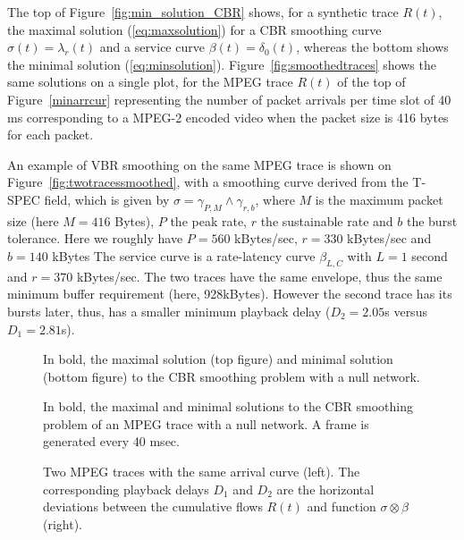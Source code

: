 The top of Figure~\ref{fig:min_solution_CBR} shows, for a synthetic trace $R(t)$,
 the maximal solution (\ref{eq:maxsolution}) for a CBR smoothing curve
$\sigma(t) = \lambda_r(t)$ and a service curve $\beta(t) = \delta_0(t)$,
whereas the bottom shows %
the minimal solution (\ref{eq:minsolution}). Figure~\ref{fig:smoothedtraces} shows the same solutions on a single
plot, for the MPEG trace $R(t)$ of the top of Figure~\ref{minarrcur} representing the number of packet arrivals per time slot of 40 ms corresponding to a MPEG-2 encoded video when the packet size is 416 bytes for each packet.

An example of VBR smoothing on the same MPEG trace is shown on Figure~\ref{fig:twotracessmoothed}, with a smoothing curve derived from the T-SPEC field, which is
given by $\sigma = \gamma_{P,M} \wedge \gamma_{r,b}$, where $M$ is the maximum packet size (here $M= 416$ Bytes),
$P$ the peak rate, $r$ the sustainable rate and $b$ the burst tolerance. Here we roughly have
$P = 560$ kBytes/sec, $r = 330$ kBytes/sec and $b = 140$ kBytes
The service curve is a rate-latency curve $\beta_{L,C}$ with $L = 1$ second and $r = 370$ kBytes/sec.
The two traces have the same envelope, thus the same minimum buffer requirement (here, 928kBytes).
However the second trace has its bursts later, thus, has a smaller
   minimum playback delay ($D_2=2.05$s versus $D_1=2.81$s).


\begin{figure}[h!]
\caption{In bold, the maximal solution (top figure) and minimal solution (bottom figure)
to the CBR  smoothing problem with a null network.}
\end{figure}

\begin{figure}[h!]
\caption{In bold, the maximal and minimal solutions
to the CBR  smoothing problem of an MPEG trace with a null network. A frame is generated every 40 msec.}
\end{figure}

\begin{figure}[h!]
\caption{Two MPEG traces with the same arrival curve (left). The corresponding playback delays $D_1$ and $D_2$ are the horizontal deviations between the cumulative flows $R(t)$ and function $\sigma \otimes \beta$ (right).}
\end{figure}

